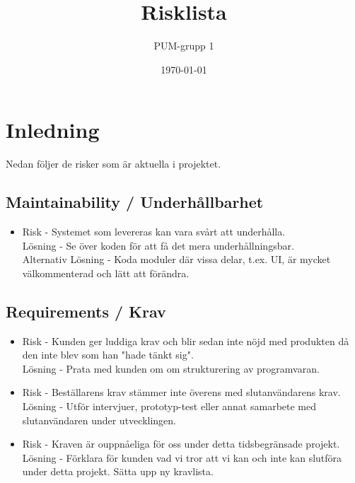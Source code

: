 

\ifpdf
\else
\fi

\title{Risklista}
\author{PUM-grupp 1}
\date{\today}



\maketitle\thispagestyle{empty}

\newpage

\setcounter{tocdepth}{2}
\tableofcontents
\newpage

\section{Inledning}
Nedan följer de risker som är aktuella i projektet.

\subsection{Maintainability / Underhållbarhet}
\begin{itemize}
\item Risk - Systemet som levereras kan vara svårt att underhålla.
\\Lösning - Se över koden för att få det mera underhållningsbar.
\\Alternativ Lösning - Koda moduler där vissa delar, t.ex. UI, är mycket välkommenterad och lätt att förändra.
\end{itemize}

\subsection{Requirements / Krav}
\begin{itemize}
\item Risk - Kunden ger luddiga krav och blir sedan inte nöjd med produkten då den inte blev som han "hade tänkt sig".
\\Lösning - Prata med kunden om om strukturering av programvaran.
\item Risk - Beställarens krav stämmer inte överens med slutanvändarens krav.
\\Lösning - Utför intervjuer, prototyp-test eller annat samarbete med slutanvändaren under utvecklingen.
\item Risk - Kraven är ouppnåeliga för oss under detta tidsbegränsade projekt.
\\Lösning - Förklara för kunden vad vi tror att vi kan och inte kan slutföra under detta projekt. Sätta upp ny kravlista.
\end{itemize}

